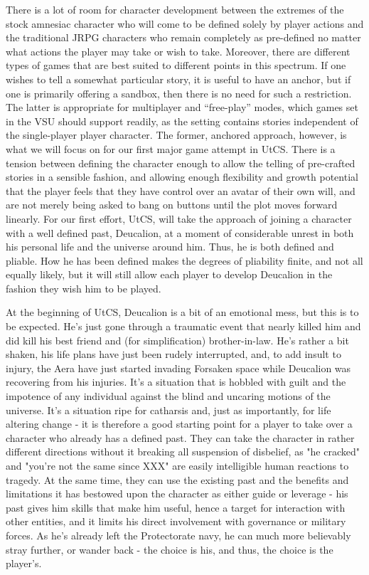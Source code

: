 There is a lot of room for character development between the extremes
of the stock amnesiac character who will come to be defined solely by
player actions and the traditional JRPG characters who remain
completely as pre-defined no matter what actions the player may take
or wish to take. Moreover, there are different types of games that are
best suited to different points in this spectrum. If one wishes to
tell a somewhat particular story, it is useful to have an anchor, but
if one is primarily offering a sandbox, then there is no need for such
a restriction. The latter is appropriate for multiplayer and
``free-play'' modes, which games set in the VSU should support
readily, as the setting contains stories independent of the
single-player player character. The former, anchored approach,
however, is what we will focus on for our first major game attempt in
UtCS. There is a tension between defining the character enough to
allow the telling of pre-crafted stories in a sensible fashion, and
allowing enough flexibility and growth potential that the player feels
that they have control over an avatar of their own will, and are not
merely being asked to bang on buttons until the plot moves forward
linearly. For our first effort, UtCS, will take the approach of
joining a character with a well defined past, Deucalion, at a moment
of considerable unrest in both his personal life and the universe
around him. Thus, he is both defined and pliable. How he has been
defined makes the degrees of pliability finite, and not all equally
likely, but it will still allow each player to develop Deucalion in
the fashion they wish him to be played.

At the beginning of UtCS, Deucalion is a bit of an emotional mess, but
this is to be expected. He's just gone through a traumatic event that
nearly killed him and did kill his best friend and (for
simplification) brother-in-law. He's rather a bit shaken, his life
plans have just been rudely interrupted, and, to add insult to injury,
the Aera have just started invading Forsaken space while Deucalion was
recovering from his injuries. It's a situation that is hobbled with
guilt and the impotence of any individual against the blind and
uncaring motions of the universe. It's a situation ripe for catharsis
and, just as importantly, for life altering change - it is therefore a
good starting point for a player to take over a character who already
has a defined past. They can take the character in rather different
directions without it breaking all suspension of disbelief, as "he
cracked" and "you're not the same since XXX" are easily intelligible
human reactions to tragedy. At the same time, they can use the
existing past and the benefits and limitations it has bestowed upon
the character as either guide or leverage - his past gives him skills
that make him useful, hence a target for interaction with other
entities, and it limits his direct involvement with governance or
military forces. As he's already left the Protectorate navy, he can
much more believably stray further, or wander back - the choice is
his, and thus, the choice is the player's.

